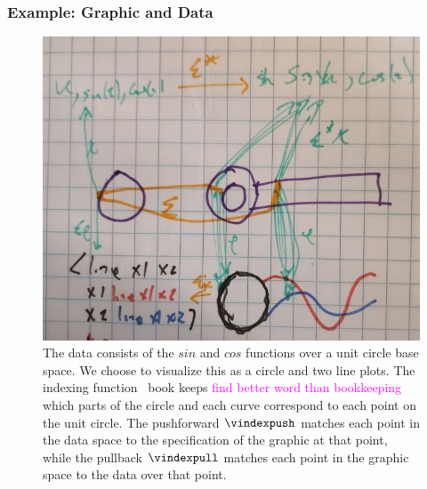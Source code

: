 \documentclass[journal]{IEEEtran}
\newcommand{\note}[1]{\textcolor{magenta}{#1}}
\theoremstyle{definition}
\theoremstyle{remark}
\begin{document}
\subsubsection{Example: Graphic and Data}
\begin{figure}[H]
  \includegraphics*[width=1\columnwidth]{xi_sin.png}
  \caption{The data consists of the $sin$ and $cos$ functions over a unit circle base space. We choose to visualize this as a circle and two line plots. The indexing function \vindex\ book keeps \note{find better word than bookkeeping} which parts of the circle and each curve correspond to each point on the unit circle. The pushforward $\vindexpush$ matches each point in the data space to the specification of the graphic at that point, while the pullback $\vindexpull$ matches each point in the graphic space to the data over that point. \label{fig:atct:morphisms:sheaf}} 
\end{figure}
\end{document}
